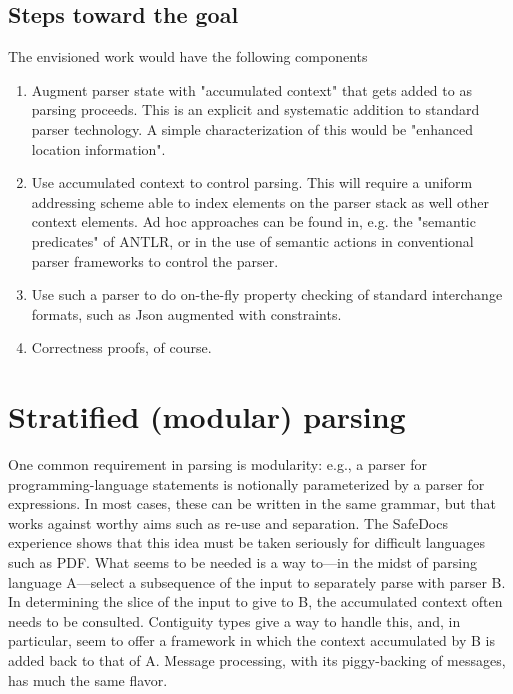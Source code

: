 \documentclass{article}
\begin{document}
\subsection{Steps toward the goal}

   The envisioned work would have the following components

\begin{enumerate}

\item Augment parser state with "accumulated context" that gets added
      to as parsing proceeds. This is an explicit and systematic
      addition to standard parser technology. A simple
      characterization of this would be "enhanced location
      information".

\item Use accumulated context to control parsing. This will require a
      uniform addressing scheme able to index elements on the parser
      stack as well other context elements. Ad hoc approaches can be
      found in, e.g. the "semantic predicates" of ANTLR, or in the use
      of semantic actions in conventional parser frameworks to control
      the parser.

\item Use such a parser to do on-the-fly property checking of standard
      interchange formats, such as Json augmented with constraints.

\item Correctness proofs, of course.
\end{enumerate}

\section{Stratified (modular) parsing}

   One common requirement in parsing is modularity: e.g., a parser for
   programming-language statements is notionally parameterized by a
   parser for expressions. In most cases, these can be written in the
   same grammar, but that works against worthy aims such as re-use and
   separation. The SafeDocs experience shows that this idea must be
   taken seriously for difficult languages such as PDF. What seems to
   be needed is a way to---in the midst of parsing language A---select
   a subsequence of the input to separately parse with parser B. In
   determining the slice of the input to give to B, the accumulated
   context often needs to be consulted. Contiguity types give a way to
   handle this, and, in particular, seem to offer a framework in which
   the context accumulated by B is added back to that of A. Message
   processing, with its piggy-backing of messages, has much the same
   flavor.
\end{document}
